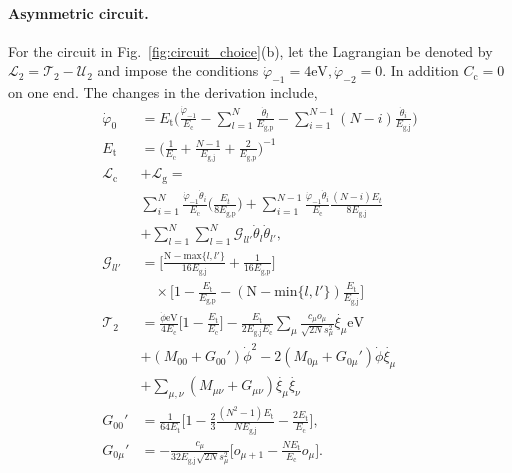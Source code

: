 \documentclass[%
reprint,
superscriptaddress,
 amsmath,amssymb,
 aps,
 prx,
longbibliography,
floatfix,
]{revtex4-2}
\begin{document}
\paragraph{Asymmetric circuit.} For the circuit in Fig.~\ref{fig:circuit_choice}(b), let the Lagrangian be denoted by $\mathcal{L}_2=\mathcal{T}_2-\mathcal{U}_2$ and impose the conditions 
$\dot{\varphi}_{-1}=4\textrm{eV},\dot{\varphi}_{-2}=0$. In addition $C_\textrm{c}=0$ on one end. The changes in the derivation include,
\begin{align}
\dot{\varphi}_0&=E_{\textrm{t}}\Big(\frac{\dot{\varphi}_{-1}}{E_{\textrm{c}}}-\sum_{l=1}^{N}\frac{\dot{\theta}_l}{E_{\textrm{g,p}}}-\sum_{i=1}^{N-1}(N-i)\frac{\dot{\theta}_i}{E_{\textrm{g,j}}}\Big)\\
E_\textrm{t}&=\Big(\frac{1}{E_{\textrm{c}}}+\frac{N-1}{E_{\textrm{g,j}}}+\frac{2}{E_{\textrm{g,p}}}\Big)^{-1}\\
\mathcal{L}_\textrm{c}&+\mathcal{L}_\textrm{g}
=\nonumber\\&\sum_{i=1}^N\frac{\dot{\varphi}_{-1}\dot{\theta}_i}{E_\textrm{c}}\Big(\frac{E_t}{8E_\textrm{g,p}}\Big)+\sum_{i=1}^{N-1}\frac{\dot{\varphi}_{-1}\dot{\theta}_i}{E_\textrm{c}}\frac{(N-i)E_t}{8E_\textrm{g,j}}\nonumber\\
&+\sum_{l=1}^{N}\sum_{l=1}^{N}\mathcal{G}_{ll'}\dot{\theta}_l\dot{\theta}_{l'},\\
\mathcal{G}_{ll'}&=\Big[\frac{\textrm{N}-\text{max}\{l,l'\}}{16E_\textrm{g,j}}+\frac{1}{16E_\textrm{g,p}}\Big]\nonumber\\&\quad\times\Big[1-\frac{E_\textrm{t}}{E_\textrm{g,p}}-(\textrm{N}-\text{min}\{l,l'\})\frac{E_\textrm{t}}{E_\textrm{g,j}}\Big]\\
\mathcal{T}_2&=\frac{\dot{\phi}\textrm{eV}}{4E_\textrm{c}}\Big[1-\frac{E_\textrm{t}}{E_\textrm{c}}\Big]-\frac{E_{\textrm{t}}}{2E_{\textrm{g,j}}E_{\textrm{c}}} \sum_\mu\frac{c_\mu o_\mu}{\sqrt{2N}s_\mu^2} \dot{\xi_\mu}\textrm{eV}\nonumber\\&+(M_{00}+G_{00}')\dot{\phi}^2-2(M_{0\mu}+G_{0\mu}')\dot{\phi}\dot{\xi_\mu}\nonumber\\&+\sum_{\mu,\nu}(M_{\mu\nu}+G_{\mu\nu})\dot{\xi_\mu}\dot{\xi_\nu}\\
G_{00}'&=\frac{1}{64E_{\textrm{t}}}\Bigg[1-\frac{2}{3}\frac{(N^2-1)E_\textrm{t}}{NE_\textrm{g,j}}-\frac{2E_\textrm{t}}{E_\textrm{c}}\Bigg],\\
G_{0\mu}'&=-\frac{c_\mu}{32E_{\textrm{g,j}}\sqrt{2N}s_\mu^2}\Bigg[o_{\mu+1}-\frac{NE_\textrm{t}}{E_\textrm{c}}o_{\mu}\Bigg].
\end{align}
\end{document}
